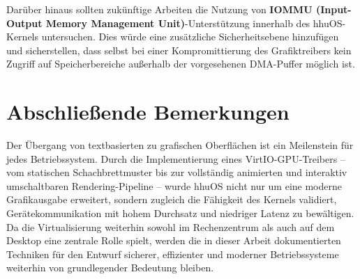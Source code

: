 Darüber hinaus sollten zukünftige Arbeiten die Nutzung von
\textbf{IOMMU (Input-Output Memory Management Unit)}-Unterstützung innerhalb
des hhuOS-Kernels untersuchen. Dies würde eine zusätzliche Sicherheitsebene
hinzufügen und sicherstellen, dass selbst bei einer Kompromittierung des
Grafiktreibers kein Zugriff auf Speicherbereiche außerhalb der vorgesehenen
DMA-Puffer möglich ist.

\section{Abschließende Bemerkungen}
Der Übergang von textbasierten zu grafischen Oberflächen ist ein Meilenstein
für jedes Betriebssystem. Durch die Implementierung eines
VirtIO-GPU-Treibers -- vom statischen Schachbrettmuster bis zur vollständig
animierten und interaktiv umschaltbaren Rendering-Pipeline -- wurde hhuOS nicht
nur um eine moderne Grafikausgabe erweitert, sondern zugleich die Fähigkeit des
Kernels validiert, Gerätekommunikation mit hohem Durchsatz und niedriger
Latenz zu bewältigen. Da die Virtualisierung weiterhin sowohl im Rechenzentrum
als auch auf dem Desktop eine zentrale Rolle spielt, werden die in dieser
Arbeit dokumentierten Techniken für den Entwurf sicherer, effizienter und
moderner Betriebssysteme weiterhin von grundlegender Bedeutung bleiben.